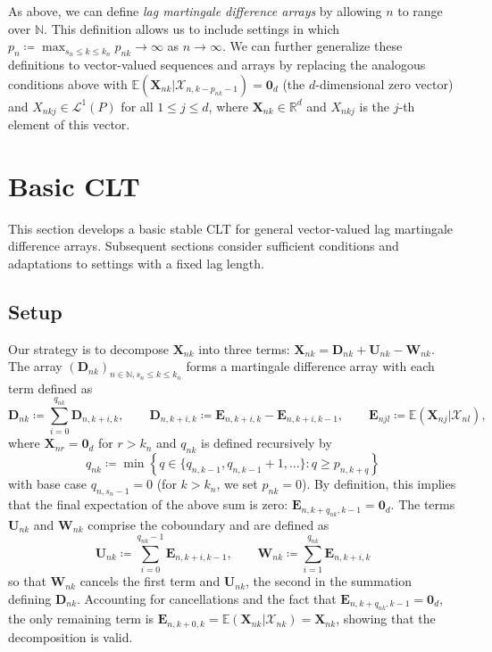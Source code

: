 \documentclass[11pt]{article}
\renewcommand\vec[1]{\boldsymbol{#1}}
\newcommand{\E}{\mathbb{E}}
\newcommand{\R}{\mathbb{R}}
\newcommand{\N}{\mathbb{N}}
\newcommand{\X}{\mathcal{X}}
\renewcommand{\L}{\mathcal{L}}
\theoremstyle{definition}
\begin{document}
As above, we can define \emph{lag martingale difference arrays} by allowing $n$ to range over $\N$.
This definition allows us to include settings in which $p_n \coloneqq \max_{s_n \leq k \leq k_n} p_{nk} \to \infty$ as $n \to \infty$.
We can further generalize these definitions to vector-valued sequences and arrays by replacing the analogous conditions above with $\E(\vec{X}_{nk} | \X_{n,k-p_{nk}-1}) = \vec{0}_d$ (the $d$-dimensional zero vector) and $X_{nkj} \in \L^1(P)$ for all $1 \leq j \leq d$, where $\vec{X}_{nk} \in \R^d$ and $X_{nkj}$ is the $j$-th element of this vector.

\section{Basic CLT}\label{sec:basic-clt}

This section develops a basic stable CLT for general vector-valued lag martingale difference arrays.
Subsequent sections consider sufficient conditions and adaptations to settings with a fixed lag length.

\subsection{Setup}\label{sec:basic-clt-setup}

Our strategy is to decompose $\vec{X}_{nk}$ into three terms: $\vec{X}_{nk} = \vec{D}_{nk} + \vec{U}_{nk} - \vec{W}_{nk}$.
The array $(\vec{D}_{nk})_{n \in \N, s_n \leq k \leq k_n}$ forms a martingale difference array with each term defined as
\[
\vec{D}_{nk} \coloneqq \sum_{i=0}^{q_{nk}} \vec{D}_{n,k+i,k}, \qquad \vec{D}_{n,k+i,k} \coloneqq \vec{E}_{n,k+i,k} - \vec{E}_{n,k+i,k-1}, \qquad \vec{E}_{njl} \coloneqq \E\left(\vec{X}_{nj} | \X_{nl}\right),
\]
where $\vec{X}_{nr}=\vec{0}_d$ for $r>k_n$ and $q_{nk}$ is defined recursively by
\[
q_{nk}
\coloneqq
\min\left\{
q\in\{q_{n,k-1}, q_{n,k-1} + 1,\ldots\}: q \geq p_{n,k+q}
\right\}
\]
with base case $q_{n,s_n-1} = 0$ (for $k > k_n$, we set $p_{nk} = 0$).
By definition, this implies that the final expectation of the above sum is zero: $\vec{E}_{n,k+q_{nk},k-1} = \vec{0}_d$.
The terms $\vec{U}_{nk}$ and $\vec{W}_{nk}$ comprise the coboundary and are defined as
\[
\vec{U}_{nk} \coloneqq \sum_{i=0}^{q_{nk} - 1} \vec{E}_{n,k+i,k-1}, \qquad \vec{W}_{nk} \coloneqq \sum_{i=1}^{q_{nk}} \vec{E}_{n,k+i,k}
\]
so that $\vec{W}_{nk}$ cancels the first term and $\vec{U}_{nk}$, the second in the summation defining $\vec{D}_{nk}$.
Accounting for cancellations and the fact that $\vec{E}_{n,k+q_{nk},k-1} = \vec{0}_d$, the only remaining term is $\vec{E}_{n,k+0,k} = \E(\vec{X}_{nk} | \X_{nk}) = \vec{X}_{nk}$, showing that the decomposition is valid.
\end{document}
